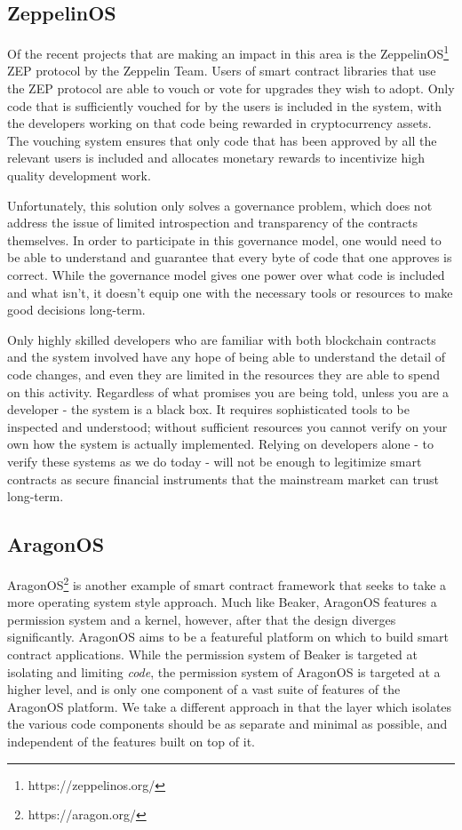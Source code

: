 \documentclass[english,a4paper]{article}
\begin{document}
\subsection{ZeppelinOS}
Of the recent projects that are making an impact in this area is the
ZeppelinOS\footnote{https://zeppelinos.org/} ZEP protocol by the Zeppelin Team.
Users of smart contract
libraries that use the ZEP protocol are able to vouch or vote for
upgrades they wish to adopt. Only code that is sufficiently vouched for
by the users is included in the system, with the developers working on
that code being rewarded in cryptocurrency assets. The vouching system
ensures that only code that has been approved by all the relevant users
is included and allocates monetary rewards to incentivize high quality
development work.

Unfortunately, this solution only solves a governance problem, which
does not address the issue of limited introspection and transparency of
the contracts themselves. In order to participate in this governance
model, one would need to be able to understand and guarantee that every
byte of code that one approves is correct. While the governance model
gives one power over what code is included and what isn't, it doesn't
equip one with the necessary tools or resources to make good decisions
long-term.

Only highly skilled developers who are familiar with both blockchain
contracts and the system involved have any hope of being able to
understand the detail of code changes, and even they are limited in the
resources they are able to spend on this activity. Regardless of what
promises you are being told, unless you are a developer - the system is
a black box. It requires sophisticated tools to be inspected and
understood; without sufficient resources you cannot verify on your own
how the system is actually implemented. Relying on developers alone - to
verify these systems as we do today - will not be enough to legitimize
smart contracts as secure financial instruments that the mainstream
market can trust long-term.

\subsection{AragonOS}
AragonOS\footnote{https://aragon.org/} is another example of smart contract
framework that seeks to take a more operating system style approach. Much like
Beaker, AragonOS features a permission system and a kernel, however, after that
the design diverges significantly. AragonOS aims to be a featureful platform on
which to build smart contract applications. While the permission system of
Beaker is targeted at isolating and limiting \emph{code}, the permission system
of AragonOS is targeted at a higher level, and is only one component of a vast
suite of features of the AragonOS platform. We take a different approach in that
the layer which isolates the various code components should be as separate and
minimal as possible, and independent of the features built on top of it.
\end{document}
